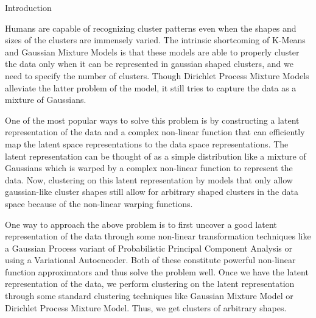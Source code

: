 \documentclass{article}
\begin{document}
\makeheader


\begin{psection}{Introduction}

	Humans are capable of recognizing cluster patterns even when the shapes and sizes of the clusters are immensely varied. The intrinsic shortcoming of K-Means and Gaussian Mixture Models is that these models are able to properly cluster the data only when it can be represented in gaussian shaped clusters, and we need to specify the number of clusters. Though Dirichlet Process Mixture Models alleviate the latter problem of the model, it still tries to capture the data as a mixture of Gaussians.

	One of the most popular ways to solve this problem is by constructing a latent representation of the data and a complex non-linear function that can efficiently map the latent space representations to the data space representations. The latent representation can be thought of as a simple distribution like a mixture of Gaussians which is warped by a complex non-linear function to represent the data. Now, clustering on this latent representation by models that only allow gaussian-like cluster shapes still allow for arbitrary shaped clusters in the data space because of the non-linear warping functions.

	One way to approach the above problem is to first uncover a good latent representation of the data through some non-linear transformation techniques like a Gaussian Process variant of Probabilistic Principal Component Analysis \citep{gplvm} or using a Variational Autoencoder. Both of these constitute powerful non-linear function approximators and thus solve the problem well. Once we have the latent representation of the data, we perform clustering on the latent representation through some standard clustering techniques like Gaussian Mixture Model or Dirichlet Process Mixture Model. Thus, we get clusters of arbitrary shapes.


\end{psection}
\end{document}
